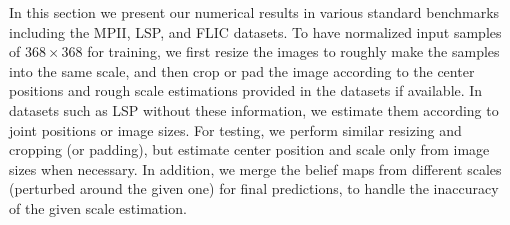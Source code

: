 \documentclass[10pt,twocolumn,letterpaper]{article}
\begin{document}
In this section we present our numerical results in various standard benchmarks including the MPII, LSP, and FLIC datasets. To have normalized input samples of $368 \times 368$ for training, we first resize the images to roughly make the samples into the same scale, and then
crop or pad the image according to the center positions and rough scale estimations provided in the datasets if available. In datasets such as LSP without these information, we estimate them according to joint positions or image sizes. For testing, we perform similar resizing and cropping (or padding), but estimate center position and scale only from image sizes when necessary. In addition, we merge the belief maps from different scales (perturbed around the given one) for final predictions, to handle the inaccuracy of the given scale estimation.
\end{document}
